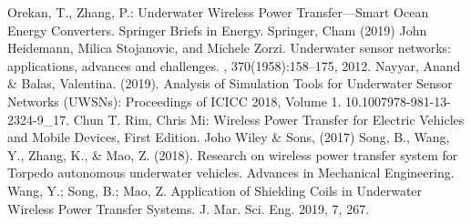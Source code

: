 \begin{thebibliography}{99}
	 Orekan, T., Zhang, P.: Underwater Wireless Power Transfer—Smart Ocean Energy Converters. Springer Briefs in Energy. Springer, Cham (2019)
	John Heidemann, Milica Stojanovic, and Michele Zorzi.
	\newblock Underwater sensor networks: applications, advances and challenges.
	, 370(1958):158--175, 2012.
	 Nayyar, Anand \& Balas, Valentina. (2019). Analysis of Simulation Tools for Underwater Sensor Networks (UWSNs): Proceedings of ICICC 2018, Volume 1. 10.1007\/978-981-13-2324-9\_17.
	 Chun T. Rim, Chris Mi: Wireless Power Transfer for Electric Vehicles and Mobile Devices, First Edition. Joho Wiley \& Sons, (2017)
	 Song, B., Wang, Y., Zhang, K., \& Mao, Z. (2018). Research on wireless power transfer system for Torpedo autonomous underwater vehicles. Advances in Mechanical Engineering.
	 Wang, Y.; Song, B.; Mao, Z. Application of Shielding Coils in Underwater Wireless Power Transfer Systems. J. Mar. Sci. Eng. 2019, 7, 267.
\end{thebibliography}